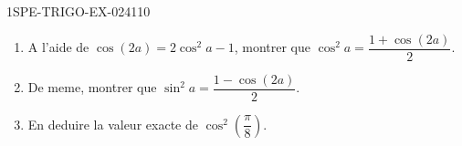 \begin{exercice}{1SPE-TRIGO-EX-024}{1}{10}
\begin{enumerate}
  \item A l'aide de $\cos(2a) = 2\cos^2 a - 1$, montrer que $\cos^2 a = \dfrac{1 + \cos(2a)}{2}$.
  \item De meme, montrer que $\sin^2 a = \dfrac{1 - \cos(2a)}{2}$.
  \item En deduire la valeur exacte de $\cos^2\!\left(\dfrac{\pi}{8}\right)$.
\end{enumerate}
\end{exercice}
